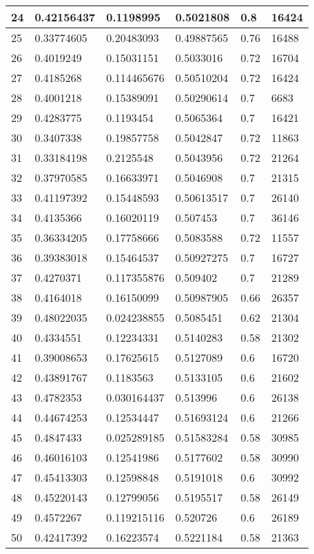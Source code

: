 \begin{longtable}{|l|l|l|l|l|l|}
24 & 0.42156437 & 0.1198995 & 0.5021808 & 0.8 & 16424 \\ \hline 
25 & 0.33774605 & 0.20483093 & 0.49887565 & 0.76 & 16488 \\ \hline 
26 & 0.4019249 & 0.15031151 & 0.5033016 & 0.72 & 16704 \\ \hline 
27 & 0.4185268 & 0.114465676 & 0.50510204 & 0.72 & 16424 \\ \hline 
28 & 0.4001218 & 0.15389091 & 0.50290614 & 0.7 & 6683 \\ \hline 
29 & 0.4283775 & 0.1193454 & 0.5065364 & 0.7 & 16421 \\ \hline 
30 & 0.3407338 & 0.19857758 & 0.5042847 & 0.72 & 11863 \\ \hline 
31 & 0.33184198 & 0.2125548 & 0.5043956 & 0.72 & 21264 \\ \hline 
32 & 0.37970585 & 0.16633971 & 0.5046908 & 0.7 & 21315 \\ \hline 
33 & 0.41197392 & 0.15448593 & 0.50613517 & 0.7 & 26140 \\ \hline 
34 & 0.4135366 & 0.16020119 & 0.507453 & 0.7 & 36146 \\ \hline 
35 & 0.36334205 & 0.17758666 & 0.5083588 & 0.72 & 11557 \\ \hline 
36 & 0.39383018 & 0.15464537 & 0.50927275 & 0.7 & 16727 \\ \hline 
37 & 0.4270371 & 0.117355876 & 0.509402 & 0.7 & 21289 \\ \hline 
38 & 0.4164018 & 0.16150099 & 0.50987905 & 0.66 & 26357 \\ \hline 
39 & 0.48022035 & 0.024238855 & 0.5085451 & 0.62 & 21304 \\ \hline 
40 & 0.4334551 & 0.12234331 & 0.5140283 & 0.58 & 21302 \\ \hline 
41 & 0.39008653 & 0.17625615 & 0.5127089 & 0.6 & 16720 \\ \hline 
42 & 0.43891767 & 0.1183563 & 0.5133105 & 0.6 & 21602 \\ \hline 
43 & 0.4782353 & 0.030164437 & 0.513996 & 0.6 & 26138 \\ \hline 
44 & 0.44674253 & 0.12534447 & 0.51693124 & 0.6 & 21266 \\ \hline 
45 & 0.4847433 & 0.025289185 & 0.51583284 & 0.58 & 30985 \\ \hline 
46 & 0.46016103 & 0.12541986 & 0.5177602 & 0.58 & 30990 \\ \hline 
47 & 0.45413303 & 0.12598848 & 0.5191018 & 0.6 & 30992 \\ \hline 
48 & 0.45220143 & 0.12799056 & 0.5195517 & 0.58 & 26149 \\ \hline 
49 & 0.4572267 & 0.119215116 & 0.520726 & 0.6 & 26189 \\ \hline 
50 & 0.42417392 & 0.16223574 & 0.5221184 & 0.58 & 21363 \\ \hline 
\end{longtable}